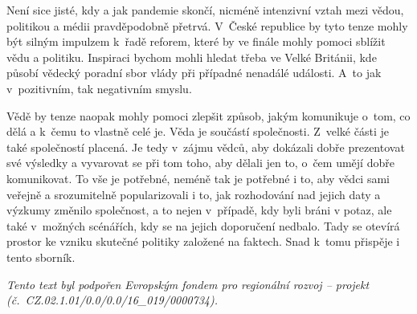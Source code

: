 Není sice jisté, kdy a jak pandemie skončí, nicméně intenzivní vztah mezi vědou, politikou a médii pravděpodobně přetrvá. V~České republice by tyto tenze mohly být silným impulzem k~řadě reforem, které by ve finále mohly pomoci sblížit vědu a politiku. Inspiraci bychom mohli hledat třeba ve Velké Británii, kde působí vědecký poradní sbor vlády při případné nenadálé události. A~to jak v~pozitivním, tak negativním smyslu.

Vědě by tenze naopak mohly pomoci zlepšit způsob, jakým komunikuje o~tom, co dělá a k~čemu to vlastně celé je. Věda je součástí společnosti. Z~velké části je také společností placená. Je tedy v~zájmu vědců, aby dokázali dobře prezentovat své výsledky a vyvarovat se při tom toho, aby dělali jen to, o~čem umějí dobře komunikovat. To vše je potřebné, neméně tak je potřebné i to, aby vědci sami veřejně a srozumitelně popularizovali i to, jak rozhodování nad jejich daty a výzkumy změnilo společnost, a to nejen v~případě, kdy byli bráni v potaz, ale také v~možných scénářích, kdy se na jejich doporučení nedbalo. Tady se otevírá prostor ke vzniku skutečné politiky založené na faktech. Snad k~tomu přispěje i tento sborník.


\vspace{2eM}
\noindent\emph{Tento text byl podpořen Evropským fondem pro regionální rozvoj -- projekt \\ (č.~CZ.02.1.01/0.0/0.0/16\_019/0000734).}
